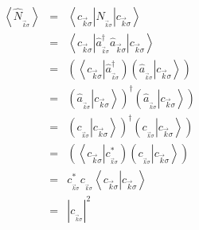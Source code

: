 \begin{eqnarray}
\left\langle \hat{N}_{_{\vec{k}\sigma}}\right> & = &\left\langle
c_{\vec{k}\sigma}\right| \hat{N}_{_{\vec{k}\sigma}}\left| c_{\vec
{k}\sigma}\right> \\
& = &\left\langle c_{\vec{k}\sigma}\right| \hat{a}_{_{\vec{k}\sigma}%
}^{\dagger}\hat{a}_{\vec{k}\sigma}\left| c_{\vec{k}\sigma}\right> \\
& = &\left( \left\langle c_{\vec{k}\sigma}\right| \hat{a}_{_{\vec{k}\sigma
}}^{\dagger}\right) \left( \hat{a}_{_{\vec{k}\sigma}}\left| c_{\vec
{k}\sigma}\right> \right) \\
& = &\left( \hat{a}_{_{\vec{k}\sigma}}\left| c_{\vec{k}\sigma}\right>
\right) ^{\dagger}\left( \hat{a}_{_{\vec{k}\sigma}}\left| c_{\vec
{k}\sigma}\right> \right) \\
& = &\left( c_{_{\vec{k}\sigma}}\left| c_{\vec{k}\sigma}\right>
\right) ^{\dagger}\left( c_{_{\vec{k}\sigma}}\left| c_{\vec{k}\sigma
}\right> \right) \\
& = &\left( \left\langle c_{\vec{k}\sigma}\right| c_{_{\vec{k}\sigma}%
}^{\ast}\right) \left( c_{_{\vec{k}\sigma}}\left| c_{\vec{k}\sigma
}\right> \right) \\
& = &c_{_{\vec{k}\sigma}}^{\ast}c_{_{\vec{k}\sigma}}\left\langle c_{\vec
{k}\sigma}\right| \left. c_{\vec{k}\sigma}\right> \\
& = &|c_{_{\vec{k}\sigma}}|^{2}%
\end{eqnarray}


